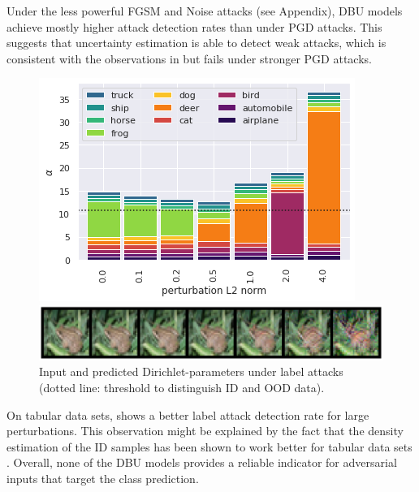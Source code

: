 Under the less powerful FGSM and Noise attacks (see Appendix), DBU models achieve mostly higher attack detection rates than under PGD attacks. This suggests that uncertainty estimation is able to detect weak attacks, which is consistent with the observations in \citep{malinin2018_adetect} but fails under stronger PGD attacks. 
%
\begin{figure}[ht]
	\centering
	\includegraphics[width=.49\textwidth]{sections/008_icml2021/eval/ddnet_label_id_cifar10_alphas.png}
	
	\includegraphics[width=.49\textwidth]{sections/008_icml2021/eval/ddnet_label_id_cifar10_images.png}
	\caption{Input and predicted Dirichlet-parameters under label attacks (dotted line: threshold to distinguish ID and OOD data). %
	}
	\label{fig:attaked_samples_labels}
\end{figure}


On tabular data sets, \PostNetacro{} shows a better label attack detection rate for large perturbations. This observation might be explained by the fact that the density estimation of the ID samples has been shown to work better for tabular data sets \citep{charpentier2020}. 
%
Overall, none of the DBU models provides a reliable indicator for adversarial inputs that target the class prediction. 





